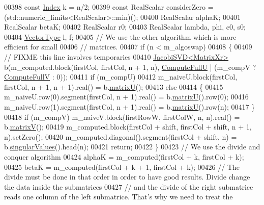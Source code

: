 \begin{DoxyCode}
00398   \textcolor{keyword}{const} \hyperlink{namespace_eigen_a62e77e0933482dafde8fe197d9a2cfde}{Index} k = n/2;
00399   \textcolor{keyword}{const} RealScalar considerZero = (std::numeric\_limits<RealScalar>::min)();
00400   RealScalar alphaK;
00401   RealScalar betaK; 
00402   RealScalar r0; 
00403   RealScalar lambda, phi, c0, s0;
00404   \hyperlink{group___core___module}{VectorType} l, f;
00405   \textcolor{comment}{// We use the other algorithm which is more efficient for small }
00406   \textcolor{comment}{// matrices.}
00407   \textcolor{keywordflow}{if} (n < m\_algoswap)
00408   \{
00409     \textcolor{comment}{// FIXME this line involves temporaries}
00410     \hyperlink{group___s_v_d___module_class_eigen_1_1_jacobi_s_v_d}{JacobiSVD<MatrixXr>} b(m\_computed.block(firstCol, firstCol, n + 1, n), 
      \hyperlink{group__enums_ggae3e239fb70022eb8747994cf5d68b4a9a2b4f91ca5859a4159dbfe8090043817f}{ComputeFullU} | (m\_compV ? \hyperlink{group__enums_ggae3e239fb70022eb8747994cf5d68b4a9a52c6f7e80bbf9a42297c88f700245b51}{ComputeFullV} : 0));
00411     \textcolor{keywordflow}{if} (m\_compU)
00412       m\_naiveU.block(firstCol, firstCol, n + 1, n + 1).real() = b.\hyperlink{group___s_v_d___module_afc7fe1546b0f6e1801b86f22f5664cb8}{matrixU}();
00413     \textcolor{keywordflow}{else} 
00414     \{
00415       m\_naiveU.row(0).segment(firstCol, n + 1).real() = b.\hyperlink{group___s_v_d___module_afc7fe1546b0f6e1801b86f22f5664cb8}{matrixU}().row(0);
00416       m\_naiveU.row(1).segment(firstCol, n + 1).real() = b.\hyperlink{group___s_v_d___module_afc7fe1546b0f6e1801b86f22f5664cb8}{matrixU}().row(n);
00417     \}
00418     \textcolor{keywordflow}{if} (m\_compV) m\_naiveV.block(firstRowW, firstColW, n, n).real() = b.\hyperlink{group___s_v_d___module_a245a453b5e7347f737295c23133238c4}{matrixV}();
00419     m\_computed.block(firstCol + shift, firstCol + shift, n + 1, n).setZero();
00420     m\_computed.diagonal().segment(firstCol + shift, n) = b.\hyperlink{group___s_v_d___module_a4e7bac123570c348f7ed6be909e1e474}{singularValues}().head(n);
00421     \textcolor{keywordflow}{return};
00422   \}
00423   \textcolor{comment}{// We use the divide and conquer algorithm}
00424   alphaK =  m\_computed(firstCol + k, firstCol + k);
00425   betaK = m\_computed(firstCol + k + 1, firstCol + k);
00426   \textcolor{comment}{// The divide must be done in that order in order to have good results. Divide change the data inside the
       submatrices}
00427   \textcolor{comment}{// and the divide of the right submatrice reads one column of the left submatrice. That's why we need to
       treat the }

\end{DoxyCode}
